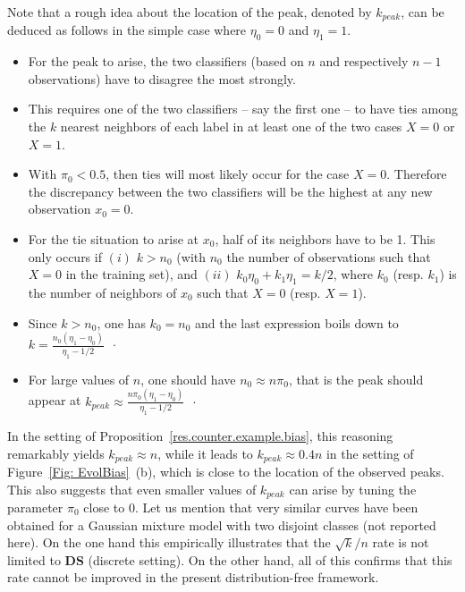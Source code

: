 \documentclass[twoside,11pt]{article}
\numberwithin{equation}{section}
\newcommand{\1}{\mathds{1}}%
\numberwithin{equation}{section}
\theoremstyle{plain}
\begin{document}
Note that a rough idea about the location of the peak, denoted by $k_{peak}$, can be deduced as follows in the simple case where $\eta_0=0$ and $\eta_1=1$.
%
\begin{itemize}
	\item For the peak to arise, the two classifiers (based on $n$ and respectively $n-1$ observations) have to disagree the most strongly.

	\item This requires one of the two classifiers -- say the first one -- to have ties among the $k$ nearest neighbors of each label in at least one of the two cases $X=0$ or $X=1$.

	\item With $\pi_0<0.5$, then ties will most likely occur for the case $X=0$. Therefore the discrepancy between the two classifiers will be the highest at any new observation $x_0=0$.

	\item For the tie situation to arise at $x_0$, half of its neighbors have to be 1.
	This only occurs if $(i)$ $k>n_0$ (with $n_0$ the number of observations such that $X=0$ in the training set), and $(ii)$ $k_0\eta_0 + k_1\eta_1 = k/2$, where $k_0$ (resp. $k_1$) is the number of neighbors of $x_0$ such that $X=0$ (resp. $X=1$).

	\item Since $k>n_0$, one has $k_0=n_0$ and the last expression boils down to $\displaystyle{k=\frac{n_0(\eta_1-\eta_0)}{\eta_1-1/2}} \enspace \cdot$

	\item For large values of $n$, one should have $n_0\approx n\pi_0$, that is the peak should appear at $\displaystyle{k_{peak}\approx\frac{ n\pi_0(\eta_1-\eta_0)}{\eta_1-1/2}} \enspace \cdot$


\end{itemize}
%
In the setting of Proposition~\ref{res.counter.example.bias}, this reasoning remarkably yields $k_{peak}\approx n$, while it leads to $k_{peak}\approx 0.4n$ in the setting of Figure~\ref{Fig: EvolBias}~(b), which is close to the location of the observed peaks.
%
This also suggests that even smaller values of $k_{peak}$ can arise by tuning the parameter $\pi_0$ close to 0.
%
Let us mention that very similar curves have been obtained for a Gaussian mixture model with two disjoint classes (not reported here).
%
On the one hand this empirically illustrates that the $\sqrt{k}/n$ rate is not limited to \textbf{DS} (discrete setting). On the other hand, all of this confirms that this rate cannot be improved in the present distribution-free framework.
\end{document}
